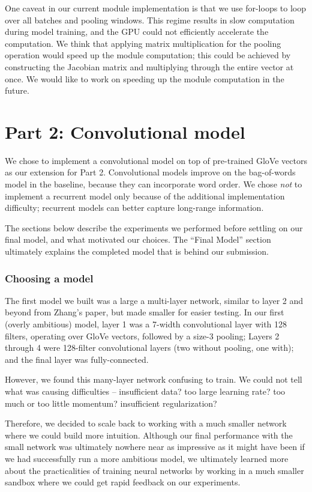 \documentclass{article}
\begin{document}
One caveat in our current module implementation is that we use for-loops to loop over all batches and pooling windows. This regime results in slow computation during model training, and the GPU could not efficiently accelerate the computation. We think that applying matrix multiplication for the pooling operation would speed up the module computation; this could be achieved by constructing the Jacobian matrix and multiplying through the entire vector at once. We would like to work on speeding up the module computation in the future. 

\section*{Part 2: Convolutional model}

We chose to implement a convolutional model on top of pre-trained GloVe vectors as our extension for Part 2. Convolutional models improve on the bag-of-words model in the baseline, because they can incorporate word order. We chose \emph{not} to implement a recurrent model only because of the additional implementation difficulty; recurrent models can better capture long-range information.

The sections below describe the experiments we performed before settling on our final model, and what motivated our choices. The ``Final Model'' section ultimately explains the completed model that is behind our submission.

\subsubsection*{Choosing a model}

The first model we built was a large a multi-layer network, similar to layer 2 and beyond from Zhang's paper, but made smaller for easier testing. In our first (overly ambitious) model, layer 1 was a 7-width convolutional layer with 128 filters, operating over GloVe vectors, followed by a size-3 pooling; Layers 2 through 4 were 128-filter convolutional layers (two without pooling, one with); and the final layer was fully-connected.

However, we found this many-layer network confusing to train. We could not tell what was causing difficulties -- insufficient data? too large learning rate? too much or too little momentum? insufficient regularization?

Therefore, we decided to scale back to working with a much smaller network where we could build more intuition. Although our final performance with the small network was ultimately nowhere near as impressive as it might have been if we had successfully run a more ambitious model, we ultimately learned more about the practicalities of training neural networks by working in a much smaller sandbox where we could get rapid feedback on our experiments.
\end{document}

